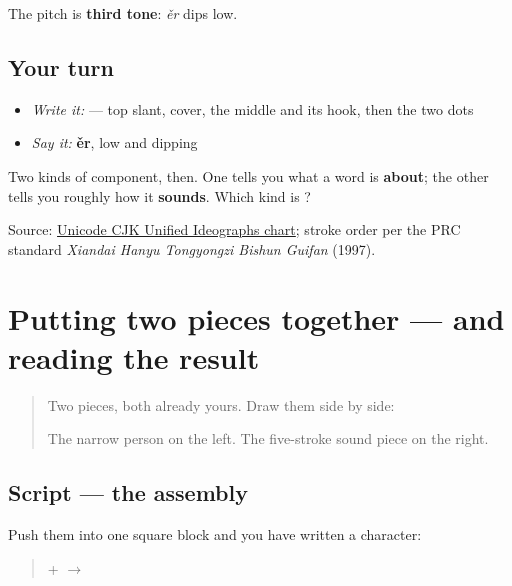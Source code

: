 The pitch is \textbf{third tone}: \emph{ěr} dips low.

\subsection*{Your turn}
\begin{itemize}
\raggedright
  \item \emph{Write it:}  — top slant, cover, the middle and its hook, then the two dots
  \item \emph{Say it:} \textbf{ěr}, low and dipping
\end{itemize}

\begin{tcolorbox}[breakable,colback=teal!4,colframe=teal!35!black,title={Before you move on}]
Two kinds of component, then. One tells you what a word is \textbf{about}; the other tells you roughly how it \textbf{sounds}. Which kind is ?

Source: \href{https://www.unicode.org/charts/PDF/U4E00.pdf}{Unicode CJK Unified Ideographs chart}; stroke order per the PRC standard \emph{Xiandai Hanyu Tongyongzi Bishun Guifan} (1997).
\end{tcolorbox}
\section[\texorpdfstring{\zh{你} (nǐ)}{你 (nǐ)}]{Putting two pieces together — and reading the result}

\label{lesson:ZH-W01-ni-build}



\begin{quote}
Two pieces, both already yours. Draw them side by side:

\begin{quote}
   
\end{quote}

The narrow person on the left. The five-stroke sound piece on the right.
\end{quote}

\subsection*{Script — the assembly}

Push them into one square block and you have written a character:

\begin{quote}
\textbf{} + \textbf{} $\to$ \textbf{}
\end{quote}

